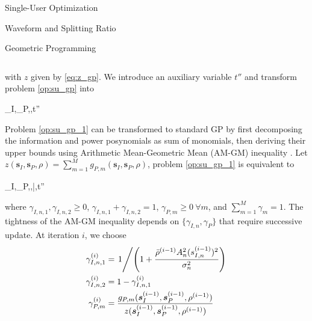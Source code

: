 \documentclass{IEEEtran}
\begin{document}
\begin{section}{Single-User Optimization}
\begin{subsection}{Waveform and Splitting Ratio}
\begin{subsubsection}{Geometric Programming}
\begin{figure*}[b]
\begin{equation}
				\end{equation}
			\end{figure*}
			with $z$ given by \ref{eq:z_gp}. We introduce an auxiliary variable $t''$ and transform problem \ref{op:su_gp} into
			\begin{mini!}
					{\boldsymbol{s}_I,_P,\rho,t''}{}{\label{op:su_gp_1}}{}
				\end{mini!}
			Problem \ref{op:su_gp_1} can be transformed to standard GP by first decomposing the information and power posynomials as sum of monomials, then deriving their upper bounds using Arithmetic Mean-Geometric Mean (AM-GM) inequality \cite{Clerckx2018b,Chiang2005}. Let $z(\boldsymbol{s}_I,\boldsymbol{s}_P,\rho)=\sum_{m=1}^{M}{g_{P,m}(\boldsymbol{s}_I,\boldsymbol{s}_P,\rho)}$, problem \ref{op:su_gp_1} is equivalent to
			\begin{mini}
				{\boldsymbol{s}_I,_P,\rho,\bar{\rho},t''}{}{\label{op:su_gp_2}}{}
			\end{mini}
			where $\gamma_{I,n,1},\gamma_{I,n,2} \ge 0$, $\gamma_{I,n,1}+\gamma_{I,n,2}=1$, $\gamma_{P,m} \ge 0 \ \forall m$, and $\sum_{m=1}^{M}{\gamma_m}=1$. The tightness of the AM-GM inequality depends on $\{\gamma_{I,n},\gamma_P\}$ that require successive update. At iteration $i$, we choose \cite{Clerckx2018b}
			\begin{align}
				\gamma_{I,n,1}^{(i)} & = \left. 1 \middle/ \left(1+\frac{\bar{\rho}^{(i-1)}{A_n^2}(s_{I,n}^{(i-1)})^2}{\sigma_n^2}\right) \right.\label{eq:gamma_I_1}\\
				\gamma_{I,n,2}^{(i)} & = 1 - \gamma_{I,n,1}^{(i)}\label{eq:gamma_I_2}\\
				\gamma_{P,m}^{(i)} & =\frac{g_{P,m}(\boldsymbol{s}_I^{(i-1)},\boldsymbol{s}_P^{(i-1)},\rho^{(i-1)})}{z(\boldsymbol{s}_I^{(i-1)},\boldsymbol{s}_P^{(i-1)},\rho^{(i-1)})}\label{eq:gamma_P}

\end{align}
\end{subsubsection}
\end{subsection}
\end{section}
\end{document}
